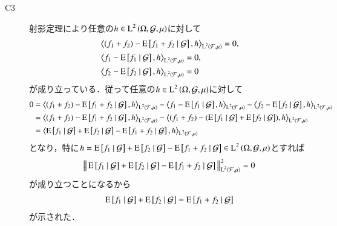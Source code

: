\begin{prf}
\begin{description}
			\item[C3] 
				射影定理により任意の$h \in \operatorname{L}^{2} \left(\Omega, \mathcal{G},\mu\right)$に対して
				\begin{align}
					&\inprod<(f_1 + f_2) - \cexp{f_1 + f_2}{\mathcal{G}}, h>_{\Lp{2}{\mathcal{F},\mu}} = 0, \\
					&\inprod<f_1 - \cexp{f_1}{\mathcal{G}}, h>_{\Lp{2}{\mathcal{F},\mu}} = 0, \\
					&\inprod<f_2 - \cexp{f_2}{\mathcal{G}}, h>_{\Lp{2}{\mathcal{F},\mu}} = 0
				\end{align}
				が成り立っている．従って任意の$h \in \operatorname{L}^{2} \left(\Omega, \mathcal{G},\mu\right)$に対して
				\begin{align}
					0 &= \inprod<(f_1 + f_2) - \cexp{f_1 + f_2}{\mathcal{G}}, h>_{\Lp{2}{\mathcal{F},\mu}} - \inprod<f_1 - \cexp{f_1}{\mathcal{G}}, h>_{\Lp{2}{\mathcal{F},\mu}} - \inprod<f_2 - \cexp{f_2}{\mathcal{G}}, h>_{\Lp{2}{\mathcal{F},\mu}} \\
					&= \inprod<(f_1 + f_2) - \cexp{f_1 + f_2}{\mathcal{G}}, h>_{\Lp{2}{\mathcal{F},\mu}} - \inprod<(f_1 + f_2) - (\cexp{f_1}{\mathcal{G}} + \cexp{f_2}{\mathcal{G}}), h>_{\Lp{2}{\mathcal{F},\mu}} \\
					&= \inprod<\cexp{f_1}{\mathcal{G}} + \cexp{f_2}{\mathcal{G}} - \cexp{f_1 + f_2}{\mathcal{G}}, h>_{\Lp{2}{\mathcal{F},\mu}}
				\end{align}
				となり，特に$h = \operatorname{E} \left[ f_1 \ \middle|\ \mathcal{G} \right] + \operatorname{E} \left[ f_2 \ \middle|\ \mathcal{G} \right] - \operatorname{E} \left[ f_1 + f_2 \ \middle|\ \mathcal{G} \right] \in \operatorname{L}^{2} \left(\Omega, \mathcal{G},\mu\right)$とすれば
				\begin{align}
					\left\|\, \operatorname{E} \left[ f_1 \ \middle|\ \mathcal{G} \right] + \operatorname{E} \left[ f_2 \ \middle|\ \mathcal{G} \right] - \operatorname{E} \left[ f_1 + f_2 \ \middle|\ \mathcal{G} \right]\, \right\|_{\operatorname{L}^{2} \left(\mathcal{F},\mu\right)}^2 = 0
				\end{align}
				が成り立つことになるから
				\begin{align}
					\operatorname{E} \left[ f_1 \ \middle|\ \mathcal{G} \right] + \operatorname{E} \left[ f_2 \ \middle|\ \mathcal{G} \right] = \operatorname{E} \left[ f_1 + f_2 \ \middle|\ \mathcal{G} \right]
				\end{align}
				が示された．
				

\end{description}
\end{prf}
